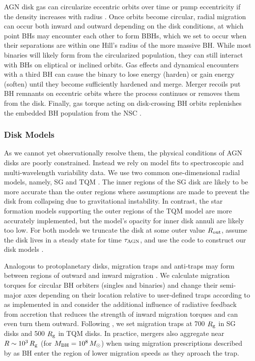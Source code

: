 AGN disk gas can circularize eccentric orbits \citep{McKernan+12} over time or pump eccentricity if the density increases with radius \citep{Secunda+21}. 
Once orbits become circular, radial migration can occur both inward and outward depending on the disk conditions, at which point BHs may encounter each other to form BBHs, which we set to occur when their separations are within one Hill's radius of the more massive BH.
While most binaries will likely form from the circularized population, they can still interact with BHs on eliptical or inclined orbits.
Gas effects and dynamical encounters with a third BH can cause the binary to lose energy (harden) or gain energy (soften) until they become sufficiently hardened and merge.
Merger recoils put BH remnants on eccentric orbits where the process continues or removes them from the disk.
Finally, gas torque acting on disk-crossing BH orbits replenishes the embedded BH population from the NSC \citep{Fabj+20,Nasim+22}.

\subsubsection{Disk Models}
As we cannot yet observationally resolve them, the physical conditions of AGN disks are poorly constrained.
Instead we rely on model fits to spectroscopic and multi-wavelength variability data.
We use two common one-dimensional radial models, namely, SG \citep{SirkoGoodman03} and TQM \citep{ThompsonQuataertMurray05}.
The inner regions of the SG disk are likely to be more accurate than the outer regions where assumptions are made to prevent the disk from collapsing due to gravitational instability.
In contrast, the star formation models supporting the outer regions of the TQM model are more accurately implemented, but the model's opacity for inner disk annuli are likely too low.
For both models we truncate the disk at some outer value $R_{\rm out}$, assume the disk lives in a steady state for time $\tau_{\rm AGN}$, and use the  code to construct our disk models \citep{Gangardt+24-pAGN}.

Analogous to protoplanetary disks, migration traps and anti-traps may form between regions of outward and inward migration \citep{Lyra+10}.
We calculate migration torques for circular BH orbiters (singles and binaries) and change their semi-major axes depending on their location relative to user-defined traps according to \citet{Paardekooper+10} as implemented in \citet{GrishinGilbaumStone24} and consider the additional influence of radiative feedback from accretion \citep{HanklaJiangArmitage20} that reduces the strength of inward migration torques and can even turn them outward.
Following \citet{Bellovary+16}, we set migration traps at 700 $R_{\rm g}$ in SG disks and 500 $R_{\rm g}$ in TQM disks.
In practice, mergers also aggregate near $R\sim10^3\,R_{\rm g}$ (for $M_{\rm BH} = 10^8\,M_{\odot}$) when using migration prescriptions described by \citet{GrishinGilbaumStone24} as BH enter the region of lower migration speeds as they aproach the trap.

